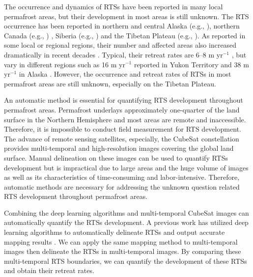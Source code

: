 \documentclass[authoryear,preprint,review,12pt]{elsarticle}
\begin{document}
The occurrence and dynamics of RTSs have been reported in many local permafrost areas, but their development in most areas is still unknown. 
The RTS occurrence has been reported in northern and central Alaska (e.g., \citealp{swanson2018growth,balser2014timing}), northern Canada (e.g., \citealp{burn1990canadian, cassidy2017impacts, armstrong2018thaw,lewkowicz2019extremes}) , Siberia (e.g., \citealp{leibman2003dynamics, zwieback2018sub}) and the Tibetan Plateau (e.g., \citealp{niu2005engineering, niu2016thaw}). 
As reported in some local or regional regions, their number and affected areas also increased dramatically in recent decades \citep{luo2019recent, lewkowicz2019extremes}.
Typical, their retreat rates are 6--8 m yr$^{-1}$ \citep{jorgenson_thermokarst_2013}, but vary in different regions such as 16 m yr$^{-1}$ reported in Yukon Territory \citep{burn1989geomorphology} and 38 m yr$^{-1}$  in Alaska \citep{swanson2018growth}.
However, the occurrence and retreat rates of RTSs in most permafrost areas are still unknown, especially on the Tibetan Plateau. 

An automatic method is essential for quantifying RTS development throughout permafrost areas. 
Permafrost underlays approximately one-quarter of the land surface in the Northern Hemisphere \citep{zhang1999statistics} and most areas are remote and inaccessible. 
Therefore, it is impossible to conduct field measurement for RTS development. 
The advance of remote sensing satellites, especially, the CubeSat constellation provides multi-temporal and high-resolution images covering the global land surface. 
Manual delineation on these images can be used to quantify RTSs development but is impractical due to large areas and the huge volume of images as well as its characteristics of time-consuming and labor-intensive. 
Therefore, automatic methods are necessary for addressing the unknown question related RTS development throughout permafrost areas. 


Combining the deep learning algorithms and multi-temporal CubeSat images can automatically quantify the RTSs development.
A previous work has utilized deep learning algorithms to automatically delineate RTSs and output accurate mapping results \citep{huang2020using}. 
We can apply the same mapping method to multi-temporal images then delineate the RTSs in multi-temporal images. 
By comparing these multi-temporal RTS boundaries, we can quantify the development of these RTSs and obtain their retreat rates. 
\end{document}
